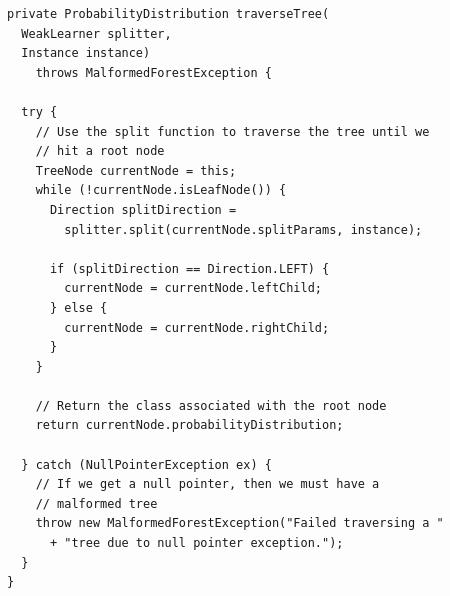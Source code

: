 \documentclass[12pt,twoside,notitlepage]{report}
\begin{document}
    \begin{lstlisting}[caption={The implementation code for tree traversal.}, label={lst:actualTraverseTree}]
private ProbabilityDistribution traverseTree(
  WeakLearner splitter, 
  Instance instance) 
    throws MalformedForestException {

  try {
    // Use the split function to traverse the tree until we 
    // hit a root node
    TreeNode currentNode = this;
    while (!currentNode.isLeafNode()) {
      Direction splitDirection = 
        splitter.split(currentNode.splitParams, instance);

      if (splitDirection == Direction.LEFT) {
        currentNode = currentNode.leftChild;
      } else {
        currentNode = currentNode.rightChild;
      }
    }
    
    // Return the class associated with the root node
    return currentNode.probabilityDistribution;
    
  } catch (NullPointerException ex) {
    // If we get a null pointer, then we must have a 
    // malformed tree
    throw new MalformedForestException("Failed traversing a "
      + "tree due to null pointer exception.");
  }
}
    \end{lstlisting}
\end{document}
